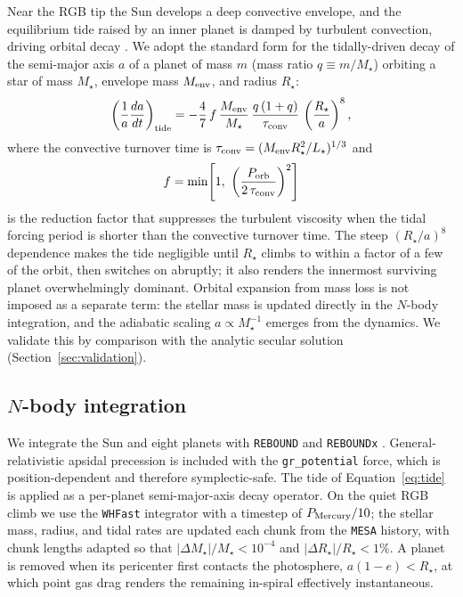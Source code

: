 \documentclass[twocolumn]{aastex631}
\newcommand{\code}[1]{\texttt{#1}}
\begin{document}
Near the RGB tip the Sun develops a deep convective envelope, and the equilibrium
tide raised by an inner planet is damped by turbulent convection, driving orbital
decay \citep{Zahn1977,Zahn1989,VerbuntPhinney1995}. We adopt the standard form for
the tidally-driven decay of the semi-major axis $a$ of a planet of mass $m$
(mass ratio $q\equiv m/M_\star$) orbiting a star of mass $M_\star$, envelope mass
$M_{\rm env}$, and radius $R_\star$:
\begin{equation}
\left(\frac{1}{a}\frac{da}{dt}\right)_{\rm tide}
= -\frac{4}{7}\, f\, \frac{M_{\rm env}}{M_\star}\,
\frac{q\,(1+q)}{\tau_{\rm conv}}\,
\left(\frac{R_\star}{a}\right)^{8},
\label{eq:tide}
\end{equation}
where the convective turnover time is
$\tau_{\rm conv}=(M_{\rm env}R_\star^2/L_\star)^{1/3}$ and
\begin{equation}
f = \min\!\left[1,\ \left(\frac{P_{\rm orb}}{2\,\tau_{\rm conv}}\right)^2\right]
\end{equation}
is the \citet{GoldreichNicholson1977} reduction factor that suppresses the
turbulent viscosity when the tidal forcing period is shorter than the convective
turnover time. The steep $(R_\star/a)^8$ dependence makes the tide negligible until
$R_\star$ climbs to within a factor of a few of the orbit, then switches on
abruptly; it also renders the innermost surviving planet overwhelmingly dominant.
Orbital expansion from mass loss is not imposed as a separate term: the stellar mass
is updated directly in the $N$-body integration, and the adiabatic scaling
$a\propto M_\star^{-1}$ emerges from the dynamics. We validate this by comparison
with the analytic secular solution (Section~\ref{sec:validation}).

\subsection{$N$-body integration}

We integrate the Sun and eight planets with \code{REBOUND}
\citep{ReinLiu2012} and \code{REBOUNDx} \citep{Tamayo2020}. General-relativistic
apsidal precession is included with the \code{gr\_potential} force, which is
position-dependent and therefore symplectic-safe. The tide of
Equation~\eqref{eq:tide} is applied as a per-planet semi-major-axis decay operator.
On the quiet RGB climb we use the \code{WHFast} integrator \citep{ReinTamayo2015}
with a timestep of $P_{\rm Mercury}/10$; the stellar mass, radius, and tidal rates
are updated each chunk from the \code{MESA} history, with chunk lengths adapted so
that $|\Delta M_\star|/M_\star<10^{-4}$ and $|\Delta R_\star|/R_\star<1\%$. A planet
is removed when its pericenter first contacts the photosphere, $a(1-e)<R_\star$, at
which point gas drag renders the remaining in-spiral effectively instantaneous.
\end{document}
